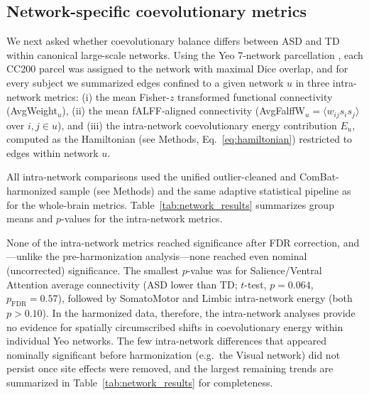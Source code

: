 \documentclass[10pt,letterpaper]{article}
\begin{document}
\subsection*{Network-specific coevolutionary metrics}

We next asked whether coevolutionary balance differs between ASD and TD within canonical large-scale
networks. Using the Yeo 7-network parcellation \cite{Yeo2011}, each CC200 parcel was assigned to
the network with maximal Dice overlap, and for every subject we summarized edges confined to a given
network $u$ in three intra-network metrics: (i) the mean Fisher-$z$ transformed functional
connectivity (AvgWeight$_u$), (ii) the mean fALFF-aligned connectivity (AvgFalffW$_u = \langle
w_{ij} s_i s_j \rangle$ over $i,j \in u$), and (iii) the intra-network coevolutionary energy
contribution $E_u$, computed as the Hamiltonian (see Methods, Eq.~\ref{eq:hamiltonian}) restricted
to edges within network $u$.

All intra-network comparisons used the unified outlier-cleaned and ComBat-harmonized sample (see
Methods) and the same adaptive statistical pipeline as for the whole-brain metrics.
Table~\ref{tab:network_results} summarizes group means and $p$-values for the intra-network metrics.

None of the intra-network metrics reached significance after FDR correction, and---unlike the
pre-harmonization analysis---none reached even nominal (uncorrected) significance. The smallest
$p$-value was for Salience/Ventral Attention average connectivity (ASD lower than TD; $t$-test,
$p = 0.064$, $p_{\mathrm{FDR}} = 0.57$), followed by SomatoMotor and Limbic intra-network energy
(both $p > 0.10$). In the harmonized data, therefore, the intra-network analyses provide no evidence
for spatially circumscribed shifts in coevolutionary energy within individual Yeo networks. The few
intra-network differences that appeared nominally significant before harmonization (e.g.\ the Visual
network) did not persist once site effects were removed, and the largest remaining trends are
summarized in Table~\ref{tab:network_results} for completeness.
\end{document}
